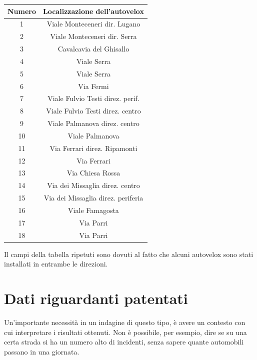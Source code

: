 \documentclass[a4paper,12pt]{report}
\begin{document}
\begin{center}
    \def\arraystretch{1.5}%
    \begin{tabular}{ |c|c| } 
    \hline
    Numero & Localizzazione dell'autovelox \\ 
    \hline
    \rowcolor{TableGray}
    1   &   Viale Monteceneri  dir. Lugano\\
    2   &   Viale Monteceneri dir. Serra\\
    \rowcolor{TableGray}
    3   &   Cavalcavia del Ghisallo\\
    4   &   Viale Serra \\
    \rowcolor{TableGray}
    5   &   Viale Serra\\
    6   &   Via Fermi\\
    \rowcolor{TableGray}
    7   &   Viale Fulvio Testi direz. perif.\\
    8   &   Viale Fulvio Testi direz. centro\\
    \rowcolor{TableGray}
    9   &   Viale Palmanova  direz. centro\\
    10  &   Viale Palmanova\\
    \rowcolor{TableGray}
    11  &   Via Ferrari direz. Ripamonti\\
    12  &   Via Ferrari\\
    \rowcolor{TableGray}
    13  &   Via Chiesa Rossa\\
    14  &   Via dei Missaglia direz. centro\\
    \rowcolor{TableGray}
    15  &   Via dei Missaglia direz. periferia\\
    16  &   Viale Famagosta\\
    \rowcolor{TableGray}
    17  &   Via Parri\\
    18  &   Via Parri\\
    \hline
    \end{tabular}
    \label{ztl-milano}
\end{center}

Il campi della tabella ripetuti sono dovuti al fatto che alcuni autovelox sono stati 
installati in entrambe le direzioni.

\section{Dati riguardanti patentati}

Un'importante necessità in un indagine di questo tipo, è avere un contesto con cui 
interpretare i risultati ottenuti. 
Non è possibile, per esempio, dire se su una certa strada si ha un numero alto di 
incidenti, senza sapere quante automobili passano in una giornata.
\end{document}

